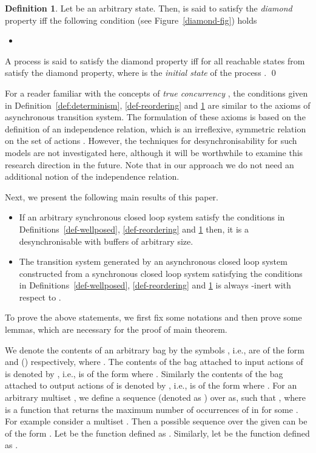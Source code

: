 \documentclass[copyright]{eptcs}
\theoremstyle{plain}
\theoremstyle{definition}
\newtheorem{definition}[theorem]{Definition}
\begin{document}
\begin{definition}\label{def-diamond}
Let  be an arbitrary state. Then,  is said to satisfy the \textit{diamond} property iff the following condition (see Figure~\ref{diamond-fig}) holds
\begin{itemize}
\item 
\end{itemize}
A process  is said to satisfy the diamond property iff for all reachable states  from  satisfy the diamond property, where  is the \emph{initial state} of the process . \qed
\end{definition}




For a reader familiar with the concepts of \emph{true concurrency} \cite{Winskel95}, the conditions given in Definition~\ref{def:determinism}, \ref{def-reordering} and \ref{def-diamond} are similar to the axioms of asynchronous transition system. The formulation of these axioms is based on the definition of an independence relation, which is an irreflexive, symmetric relation on the set of actions . However, the techniques for desynchronisability for such models are not investigated here, although it will be worthwhile to examine this research direction in the future. Note that in our approach we do not need an additional notion of the independence relation.

Next, we present the following main results of this paper.
\begin{itemize}
\item If an arbitrary synchronous closed loop system satisfy the conditions in Definitions~\ref{def-wellposed}, \ref{def-reordering} and \ref{def-diamond} then, it is a desynchronisable  with buffers of arbitrary size.
\item The transition system generated by an asynchronous closed loop system constructed from a synchronous closed loop system satisfying the conditions in Definitions~\ref{def-wellposed}, \ref{def-reordering} and \ref{def-diamond} is always -inert with respect to .
\end{itemize}
To prove the above statements, we first fix some notations and then prove some lemmas, which are necessary for the proof of main theorem.

We denote the contents of an arbitrary bag by the symbols , i.e.,  are of the form  and () respectively, where . The contents of the bag attached to input actions of  is denoted by , i.e.,  is of the form  where . Similarly the contents of the bag attached to output actions of  is denoted by , i.e.,  is of the form  where . For an arbitrary multiset , we define a sequence (denoted as ) over  as,
 such that , where  is a function that returns the maximum number of occurrences of  in  for some . For example consider a multiset . Then a possible sequence  over the given  can be of the form . Let  be the function defined as . Similarly, let  be the function defined as .
\end{document}
